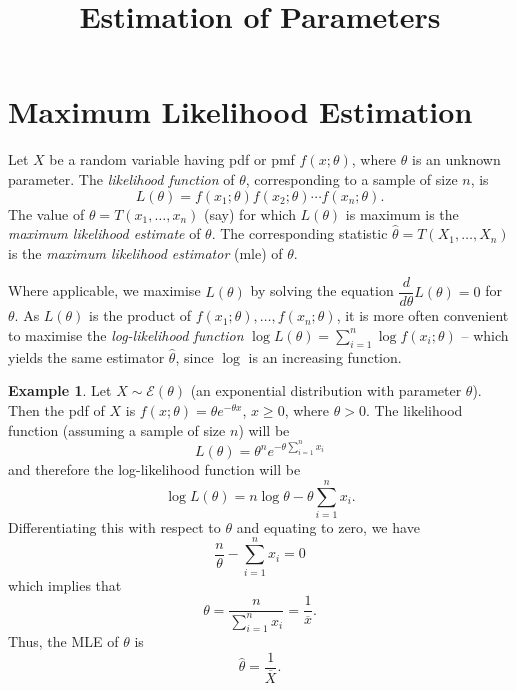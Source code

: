 \documentclass[svgnames, a5paper]{article}
\theoremstyle{definition}
\newtheorem{Example}[Theorem]{Example}
\theoremstyle{remark}
\begin{document}
\title{\textbf{Estimation of Parameters}}

\date{}
\maketitle


\section{Maximum Likelihood Estimation}\label{sec:MLE}

Let $X$ be a random variable having pdf or pmf $f(x; \theta)$, where $\theta$ is an unknown parameter. The \emph{likelihood function} of $\theta$, corresponding to a sample of size $n$, is
\begin{equation*}
L(\theta) = f(x_1; \theta) f(x_2; \theta) \cdots f(x_n; \theta).
\end{equation*}
The value of $\theta = T(x_1, \ldots, x_n)$ (say) for which $L(\theta)$ is maximum is the \emph{maximum likelihood estimate} of $\theta$. The corresponding statistic $\hat\theta = T(X_1, \ldots, X_n)$ is the \emph{maximum likelihood estimator} (mle) of $\theta$.

Where applicable, we maximise $L(\theta)$ by solving the equation $\dfrac{d}{d\theta} L(\theta) = 0$ for $\theta$. As $L(\theta)$ is the product of $f(x_1; \theta), \ldots, f(x_n; \theta)$, it is more often convenient to maximise the \emph{log-likelihood function} $\log L(\theta) = \sum_{i=1}^{n} \log f(x_i; \theta)$ -- which yields the same estimator $\hat\theta$, since $\log$ is an increasing function.

\begin{Example}
Let $X \sim \mathcal E(\theta)$ (an exponential distribution with parameter $\theta$). Then the pdf of $X$ is $f(x; \theta) = \theta e^{-\theta x}$, $x \ge 0$, where $\theta > 0$. The likelihood function (assuming a sample of size $n$) will be
\begin{equation*}
L(\theta) = \theta^n e^{-\theta \sum_{i=1}^n x_i}
\end{equation*}
and therefore the log-likelihood function will be
\begin{equation*}
\log L(\theta) = n \log \theta - \theta \sum_{i = 1}^n x_i.
\end{equation*}
Differentiating this with respect to $\theta$ and equating to zero, we have
\begin{equation*}
\frac n \theta - \sum_{i = 1}^n x_i = 0
\end{equation*}
which implies that
\begin{equation*}
\theta = \dfrac n {\sum_{i = 1}^n x_i} = \dfrac{1}{\overline x}.
\end{equation*}
Thus, the MLE of $\theta$ is
\begin{equation*}
\hat \theta = \dfrac 1 {\overline X}.
\end{equation*}
\end{Example}
\end{document}
